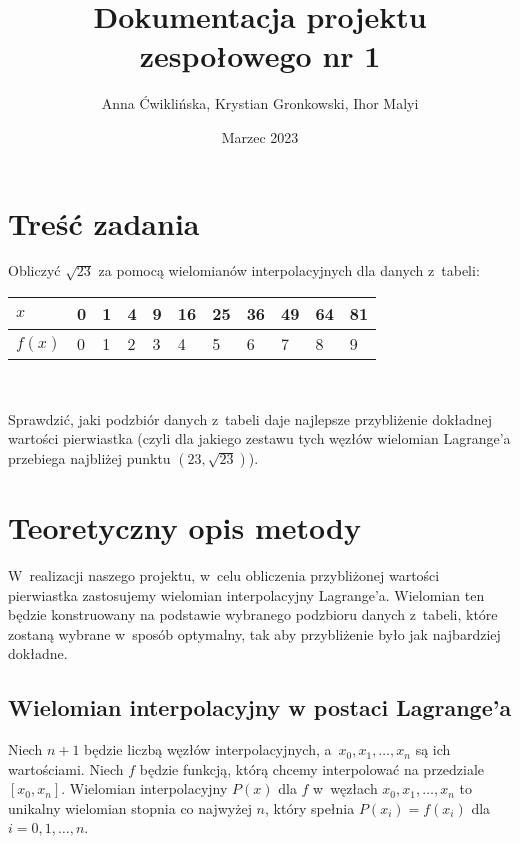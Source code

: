 \documentclass[12pt]{article}
\title{Dokumentacja projektu zespołowego nr 1}
\author{Anna Ćwiklińska, Krystian Gronkowski, Ihor Malyi}
\date{Marzec 2023}
\begin{document}
\lstset{basicstyle=\ttfamily, columns=fullflexible, upquote=true}
\renewcommand{\lstlistingname}{Listing}

\maketitle

\section{Treść zadania}
Obliczyć $\sqrt{23}$ za pomocą wielomianów interpolacyjnych dla danych z~tabeli:

\begin{table}[h]
\centering
\hypertarget{tabela}{
\begin{tabular}{l|llllllllll}
$x$    & 0 & 1 & 4 & 9 & 16 & 25 & 36 & 49 & 64 & 81 \\ \hline
$f(x)$ & 0 & 1 & 2 & 3 & 4  & 5  & 6  & 7  & 8  & 9  \\
\end{tabular}\\[0.25cm]}
\end{table}


Sprawdzić, jaki podzbiór danych z~tabeli daje najlepsze przybliżenie dokładnej wartości pierwiastka (czyli dla jakiego zestawu tych węzłów wielomian Lagrange’a przebiega najbliżej punktu $(23, \sqrt{23})$).

\section{Teoretyczny opis metody}
W~realizacji naszego projektu, w~celu obliczenia przybliżonej wartości pierwiastka zastosujemy wielomian interpolacyjny Lagrange'a. Wielomian ten będzie konstruowany na podstawie wybranego podzbioru danych z~tabeli, które zostaną wybrane w~sposób optymalny, tak aby przybliżenie było jak najbardziej dokładne.

\subsection{Wielomian interpolacyjny w postaci Lagrange'a}
Niech $n+1$ będzie liczbą węzłów interpolacyjnych, a~$x_0,x_1,\ldots,x_n$ są ich wartościami. Niech $f$ będzie funkcją, którą chcemy interpolować na przedziale $[x_0,x_n]$. Wielomian interpolacyjny $P(x)$ dla $f$ w~węzłach $x_0,x_1,\ldots,x_n$ to unikalny wielomian stopnia co najwyżej $n$, który spełnia $P(x_i) = f(x_i)$ dla $i=0,1,\ldots,n$.
\end{document}
